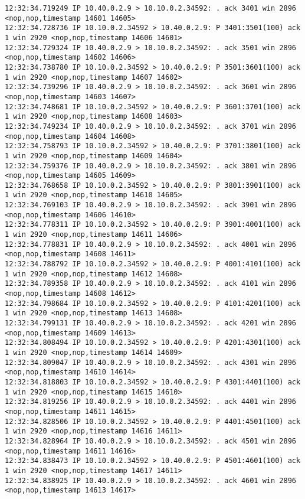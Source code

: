 \documentclass[a4paper,12pt]{article}
\begin{document}
\begin{lstlisting}
12:32:34.719249 IP 10.40.0.2.9 > 10.10.0.2.34592: . ack 3401 win 2896 <nop,nop,timestamp 14601 14605>
12:32:34.728736 IP 10.10.0.2.34592 > 10.40.0.2.9: P 3401:3501(100) ack 1 win 2920 <nop,nop,timestamp 14606 14601>
12:32:34.729324 IP 10.40.0.2.9 > 10.10.0.2.34592: . ack 3501 win 2896 <nop,nop,timestamp 14602 14606>
12:32:34.738780 IP 10.10.0.2.34592 > 10.40.0.2.9: P 3501:3601(100) ack 1 win 2920 <nop,nop,timestamp 14607 14602>
12:32:34.739296 IP 10.40.0.2.9 > 10.10.0.2.34592: . ack 3601 win 2896 <nop,nop,timestamp 14603 14607>
12:32:34.748681 IP 10.10.0.2.34592 > 10.40.0.2.9: P 3601:3701(100) ack 1 win 2920 <nop,nop,timestamp 14608 14603>
12:32:34.749234 IP 10.40.0.2.9 > 10.10.0.2.34592: . ack 3701 win 2896 <nop,nop,timestamp 14604 14608>
12:32:34.758793 IP 10.10.0.2.34592 > 10.40.0.2.9: P 3701:3801(100) ack 1 win 2920 <nop,nop,timestamp 14609 14604>
12:32:34.759376 IP 10.40.0.2.9 > 10.10.0.2.34592: . ack 3801 win 2896 <nop,nop,timestamp 14605 14609>
12:32:34.768658 IP 10.10.0.2.34592 > 10.40.0.2.9: P 3801:3901(100) ack 1 win 2920 <nop,nop,timestamp 14610 14605>
12:32:34.769103 IP 10.40.0.2.9 > 10.10.0.2.34592: . ack 3901 win 2896 <nop,nop,timestamp 14606 14610>
12:32:34.778311 IP 10.10.0.2.34592 > 10.40.0.2.9: P 3901:4001(100) ack 1 win 2920 <nop,nop,timestamp 14611 14606>
12:32:34.778831 IP 10.40.0.2.9 > 10.10.0.2.34592: . ack 4001 win 2896 <nop,nop,timestamp 14608 14611>
12:32:34.788792 IP 10.10.0.2.34592 > 10.40.0.2.9: P 4001:4101(100) ack 1 win 2920 <nop,nop,timestamp 14612 14608>
12:32:34.789358 IP 10.40.0.2.9 > 10.10.0.2.34592: . ack 4101 win 2896 <nop,nop,timestamp 14608 14612>
12:32:34.798684 IP 10.10.0.2.34592 > 10.40.0.2.9: P 4101:4201(100) ack 1 win 2920 <nop,nop,timestamp 14613 14608>
12:32:34.799131 IP 10.40.0.2.9 > 10.10.0.2.34592: . ack 4201 win 2896 <nop,nop,timestamp 14609 14613>
12:32:34.808494 IP 10.10.0.2.34592 > 10.40.0.2.9: P 4201:4301(100) ack 1 win 2920 <nop,nop,timestamp 14614 14609>
12:32:34.809047 IP 10.40.0.2.9 > 10.10.0.2.34592: . ack 4301 win 2896 <nop,nop,timestamp 14610 14614>
12:32:34.818803 IP 10.10.0.2.34592 > 10.40.0.2.9: P 4301:4401(100) ack 1 win 2920 <nop,nop,timestamp 14615 14610>
12:32:34.819256 IP 10.40.0.2.9 > 10.10.0.2.34592: . ack 4401 win 2896 <nop,nop,timestamp 14611 14615>
12:32:34.828506 IP 10.10.0.2.34592 > 10.40.0.2.9: P 4401:4501(100) ack 1 win 2920 <nop,nop,timestamp 14616 14611>
12:32:34.828964 IP 10.40.0.2.9 > 10.10.0.2.34592: . ack 4501 win 2896 <nop,nop,timestamp 14611 14616>
12:32:34.838473 IP 10.10.0.2.34592 > 10.40.0.2.9: P 4501:4601(100) ack 1 win 2920 <nop,nop,timestamp 14617 14611>
12:32:34.838925 IP 10.40.0.2.9 > 10.10.0.2.34592: . ack 4601 win 2896 <nop,nop,timestamp 14613 14617>

\end{lstlisting}
\end{document}
